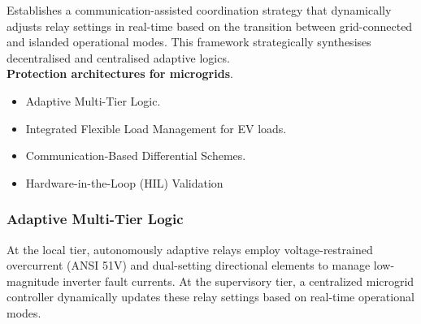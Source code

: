 

Establishes a communication-assisted coordination strategy that dynamically adjusts relay settings in real-time based on the transition between grid-connected and islanded operational modes. This framework strategically synthesises decentralised and centralised adaptive logics.\\

     \textbf{Protection architectures for microgrids}.
    \begin{itemize}
        \item Adaptive Multi-Tier Logic.
        \item Integrated Flexible Load Management for EV loads.
        \item Communication-Based Differential Schemes.
    \end{itemize}
        \begin{itemize}
            \item Hardware-in-the-Loop (HIL) Validation
        \end{itemize}







\subsubsection{Adaptive Multi-Tier Logic}
At the local tier, autonomously adaptive relays employ voltage-restrained overcurrent (ANSI 51V) and dual-setting directional elements to manage low-magnitude inverter fault currents. At the supervisory tier, a centralized microgrid controller dynamically updates these relay settings based on real-time operational modes.
